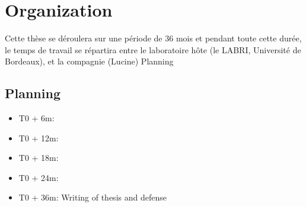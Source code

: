 \documentclass[11pt]{article}
\begin{document}
\section{Organization}
\label{sec:org3727189}
Cette thèse se déroulera sur une période de 36 mois et pendant toute cette durée, le temps de
travail se répartira entre le laboratoire hôte (le LABRI, Université de Bordeaux), et la compagnie
(Lucine)
Planning
\subsection{Planning}
\label{sec:orgcf02a1b}
\begin{itemize}
\item T0 + 6m:
\item T0 + 12m:
\item T0 + 18m:
\item T0 + 24m:
\item T0 + 36m: Writing of thesis and defense
\end{itemize}





\end{document}
